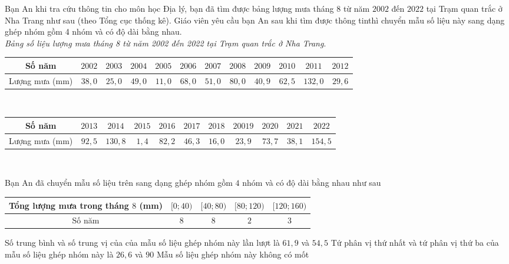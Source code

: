 \begin{ex}%
 Bạn An khi tra cứu thông tin cho môn học Địa lý, bạn đã tìm được bảng lượng mưa tháng $8$ từ năm $2002$ đến $2022$ tại Trạm quan trắc ở Nha Trang như sau (theo Tổng cục thống kê).  Giáo viên yêu cầu bạn An sau khi tìm được thông tinthì chuyển mẫu số liệu này sang dạng ghép nhóm gồm 4 nhóm và có độ dài bằng nhau.\\[2mm]
 \textit{Bảng số liệu lượng mưa tháng 8 từ năm  2002 đến 2022 tại Trạm quan trắc ở Nha Trang}.
 \begin{tabular}{|c|c|c|c|c|c|c|c|c|c|c|c|}
  \hline 
  Số năm  & $2002$ & $2003$ & $2004$ & $2005$ & $2006$ & $2007$ & $2008$ & $2009$ & $2010$ & $2011$ & $2012$\\
  \hline 
  Lượng mưa (mm) & $38{,}0$  & $25{,}0$ & $49{,}0$ & $11{,}0$ & $68{,}0$ & $51{,}0$ & $80{,}0$ & $40{,}9$ & $62{,}5$ & $132{,}0$ & $29{,}6$\\
   \hline
 \end{tabular}\\[2.5mm]
 \begin{tabular}{|c|c|c|c|c|c|c|c|c|c|c|}
   \hline
  Số năm & $2013$ & $2014$ & $2015$ &  $2016$ & $2017$ & $2018$ & $20019$ & $2020$ & $2021$ & $2022$\\
   \hline
  Lượng mưa (mm) &  $92{,}5$ & $130{,}8$ & $1{,}4$ & $82{,}2$ & $46{,}3$ & $16{,}0$ & $23{,}9$ & $73{,}7$ & $38{,}1$ & $154{,}5$ \\
   \hline
 \end{tabular}\\
  \choiceTF
  {Bạn  An đã chuyển mẫu số liệu trên sang dạng ghép nhóm gồm $4$ nhóm và có độ dài bằng nhau như sau\\
  \begin{tabular}{|c|c|c|c|c|}
   \hline 
   Tổng lượng mưa trong tháng $8$ (mm) &  $[0;40)$ & $[40;80)$ & $[80;120)$ & $[120;160)$\\
   \hline 
   Số năm & $8$ & $8$ & $2$ & $3$  \\
    \hline
 \end{tabular}}
 {Số trung bình và số trung vị của của mẫu số liệu ghép nhóm này lần lượt  là $61{,}9$ và $54{,}5$}
 {Tứ phân vị thứ nhất và tứ phân vị thứ ba của mẫu số liệu ghép nhóm này  là $26{,}6$ và $90$}
 {Mẫu số  liệu ghép nhóm này không có mốt}
\end{ex}
